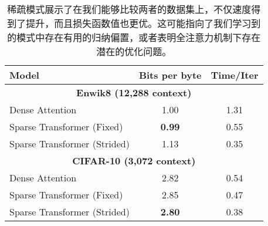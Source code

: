\begin{table}[h]
\centering
\begin{tabular}{|l|c|c|}
\hline
\textbf{Model} & \textbf{Bits per byte} & \textbf{Time/Iter} \\ \hline
\multicolumn{3}{|c|}{\textbf{Enwik8 (12,288 context)}} \\ \hline
Dense Attention & 1.00 & 1.31 \\ \hline
Sparse Transformer (Fixed) & \textbf{0.99} & 0.55 \\ \hline
Sparse Transformer (Strided) & 1.13 & 0.35 \\ \hline
\multicolumn{3}{|c|}{\textbf{CIFAR-10 (3,072 context)}} \\ \hline
Dense Attention & 2.82 & 0.54 \\ \hline
Sparse Transformer (Fixed) & 2.85 & 0.47 \\ \hline
Sparse Transformer (Strided) & \textbf{2.80} & 0.38 \\ \hline
\end{tabular}
\caption{稀疏模式展示了在我们能够比较两者的数据集上，不仅速度得到了提升，而且损失函数值也更优。这可能指向了我们学习到的模式中存在有用的归纳偏置，或者表明全注意力机制下存在潜在的优化问题。}
\label{tab:model_comparison}
\end{table}